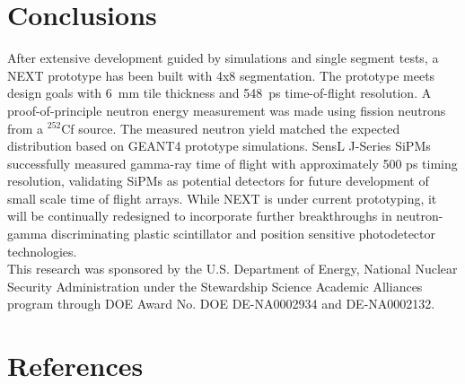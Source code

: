 \documentclass[preprint,3p,twocolumn]{elsarticle}
\begin{document}
\section{Conclusions}
After extensive development guided by simulations and single segment tests, a NEXT prototype has been built with 4x8 segmentation. The prototype meets design goals with 6~mm tile thickness and 548~ps time-of-flight resolution. A proof-of-principle neutron energy measurement was made using fission neutrons from a $^{252}$Cf source. The measured neutron yield matched the expected distribution based on GEANT4 prototype simulations.
SensL\textsuperscript{\texttrademark} J-Series SiPMs successfully measured gamma-ray time of flight with approximately 500 ps timing resolution, validating SiPMs as potential detectors for future development of small scale time of flight arrays.
While NEXT is under current prototyping, it will be continually redesigned to incorporate further breakthroughs in neutron-gamma discriminating plastic scintillator and position sensitive photodetector technologies.\\
This research was sponsored by the U.S. Department of Energy, National Nuclear Security Administration under the Stewardship Science Academic Alliances program through DOE Award No. DOE DE-NA0002934 and DE-NA0002132.

\section*{References}
%

\end{document}
